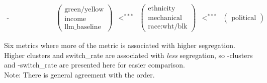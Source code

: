 \begin{table}[htbp]
\begin{align*}
\text{-switch\_rate:} & \quad \begin{pmatrix} \text{green/yellow} \\ \text{income} \\ \text{llm\_baseline} \end{pmatrix} & <^{***} & \begin{pmatrix} \text{ethnicity} \\ \text{mechanical} \\ \text{race:wht/blk} \end{pmatrix} & <^{***} & \begin{pmatrix} \text{political} \end{pmatrix}
\end{align*}
\vspace{2em}

\small{Six metrics where more of the metric is associated with higher segregation.\\
Higher clusters and switch\_rate are associated with \textit{less} segregation, so -clusters and -switch\_rate are presented here for easier comparison.\\
Note: There is general agreement with the order.}
\end{table}